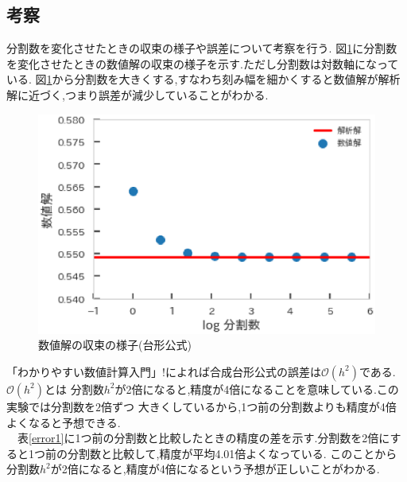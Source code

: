 \documentclass[dvipdfmx]{jarticle}
\begin{document}
    \subsection{考察}
    分割数を変化させたときの収束の様子や誤差について考察を行う.
    図\ref{fig1-1}に分割数を変化させたときの数値解の収束の様子を示す.ただし分割数は対数軸になっている.
    図\ref{fig1-1}から分割数を大きくする,すなわち刻み幅を細かくすると数値解が解析解に近づく,つまり誤差が減少していることがわかる.
    \begin{figure}[H]
      \centering
      \includegraphics[scale=0.7]{kadai1.eps}
      \caption{数値解の収束の様子(台形公式)}
       \label{fig1-1}
      \end{figure}
      「わかりやすい数値計算入門」!によれば合成台形公式の誤差は$\mathcal{O}(h^2)$である.$\mathcal{O}(h^2)$とは
      分割数$h^2$が2倍になると,精度が4倍になることを意味している.この実験では分割数を$2$倍ずつ
      大きくしているから,1つ前の分割数よりも精度が4倍よくなると予想できる.\\
      　表\ref{error1}に1つ前の分割数と比較したときの精度の差を示す.分割数を2倍にすると1つ前の分割数と比較して,精度が平均4.01倍よくなっている.
      このことから分割数$h^2$が2倍になると,精度が4倍になるという予想が正しいことがわかる.
\end{document}
